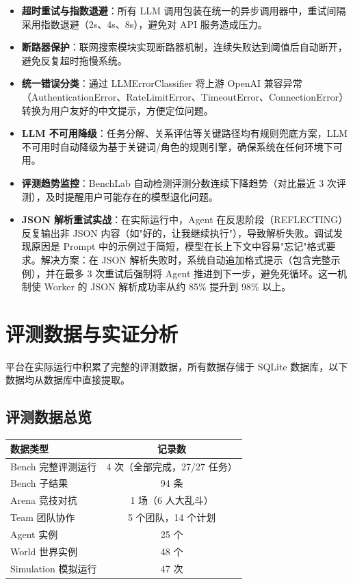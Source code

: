 \documentclass[12pt,a4paper]{article}%
\begin{document}
\begin{itemize}
	\item \textbf{超时重试与指数退避}：所有 LLM 调用包装在统一的异步调用器中，重试间隔采用指数退避（2s、4s、8s），避免对 API 服务造成压力。
	\item \textbf{断路器保护}：联网搜索模块实现断路器机制，连续失败达到阈值后自动断开，避免反复超时拖慢系统。
	\item \textbf{统一错误分类}：通过 LLMErrorClassifier 将上游 OpenAI 兼容异常（AuthenticationError、RateLimitError、TimeoutError、ConnectionError）转换为用户友好的中文提示，方便定位问题。
	\item \textbf{LLM 不可用降级}：任务分解、关系评估等关键路径均有规则兜底方案，LLM 不可用时自动降级为基于关键词/角色的规则引擎，确保系统在任何环境下可用。
	\item \textbf{评测趋势监控}：BenchLab 自动检测评测分数连续下降趋势（对比最近 3 次评测），及时提醒用户可能存在的模型退化问题。
	\item \textbf{JSON 解析重试实战}：在实际运行中，Agent 在反思阶段（REFLECTING）反复输出非 JSON 内容（如"好的，让我继续执行"），导致解析失败。调试发现原因是 Prompt 中的示例过于简短，模型在长上下文中容易"忘记"格式要求。解决方案：在 JSON 解析失败时，系统自动追加格式提示（包含完整示例），并在最多 3 次重试后强制将 Agent 推进到下一步，避免死循环。这一机制使 Worker 的 JSON 解析成功率从约 85\% 提升到 98\% 以上。
\end{itemize}

\section{评测数据与实证分析}

平台在实际运行中积累了完整的评测数据，所有数据存储于 SQLite 数据库，以下数据均从数据库中直接提取。

\subsection{评测数据总览}

\begin{table}[H]
	\centering
	\begin{tabular}{lc}
		\toprule
		\textbf{数据类型} & \textbf{记录数} \\
		\midrule
		Bench 完整评测运行 & 4 次（全部完成，27/27 任务） \\
		Bench 子结果 & 94 条 \\
		Arena 竞技对抗 & 1 场（6 人大乱斗） \\
		Team 团队协作 & 5 个团队，14 个计划 \\
		Agent 实例 & 25 个 \\
		World 世界实例 & 48 个 \\
		Simulation 模拟运行 & 47 次 \\
		\bottomrule
	\end{tabular}
\end{table}
\end{document}
